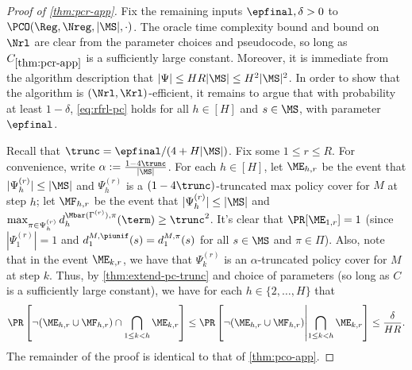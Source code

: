 \begin{proof}[Proof of \cref{thm:pcr-app}]
Fix the remaining inputs $\epfinal,\delta>0$ to $\PCO(\Reg,\Nreg,|\MS|,\cdot)$. The oracle time complexity bound and bound on $\Nrl$ are clear from the parameter choices and pseudocode, so long as $C_{\ref{thm:pcr-app}}$ is a sufficiently large constant. Moreover, it is immediate from the algorithm description that $|\Psi| \leq HR|\MS| \leq H^2|\MS|^2$. In order to show that the algorithm is $(\Nrl,\Krl)$-efficient, it remains to argue that with probability at least $1-\delta$, \cref{eq:rfrl-pc} holds for all $h \in [H]$ and $s \in \MS$, with parameter $\epfinal$.

Recall that $\trunc = \epfinal/(4+H|\MS|)$. Fix some $1 \leq r \leq R$. For convenience, write $\alpha := \frac{1-4\trunc}{|\MS|}$. For each $h \in [H]$, let $\ME_{h,r}$ be the event that $|\Psi_h^{(r)}| \leq |\MS|$ and $\Psi_h^{(r)}$ is a $(1-4\trunc)$-truncated max policy cover for $M$ at step $h$; let $\MF_{h,r}$ be the event that $|\Psi_{h}^{(r)}| \leq |\MS|$ and $\max_{\pi\in\Psi_{h}^{(r)}} d^{\Mbar(\Gamma^{(r)}),\pi}_{h}(\term) \geq \trunc^2$. It's clear that $\Pr[\ME_{1,r}] = 1$ (since $|\Psi_1^{(r)}| = 1$ and $d^{M,\piunif}_1(s) = d^{M,\pi}_1(s)$ for all $s\in\MS$ and $\pi \in \Pi$). Also, note that in the event $\ME_{k,r}$, we have that $\Psi_k^{(r)}$ is an $\alpha$-truncated policy cover for $M$ at step $k$. Thus, by \cref{thm:extend-pc-trunc} and choice of parameters (so long as $C$ is a sufficiently large constant), we have for each $h \in \{2,\dots,H\}$ that
\begin{equation} \Pr\left[\lnot (\ME_{h,r} \cup \MF_{h,r}) \cap \bigcap_{1 \leq k < h} \ME_{k,r}\right] \leq \Pr\left[\lnot (\ME_{h,r} \cup \MF_{h,r}) \middle | \bigcap_{1 \leq k < h} \ME_{k,r}\right] \leq \frac{\delta}{HR}.\label{eq:epcr-guarantee-symbolic}\end{equation}
The remainder of the proof is identical to that of \cref{thm:pco-app}. 
\end{proof}


